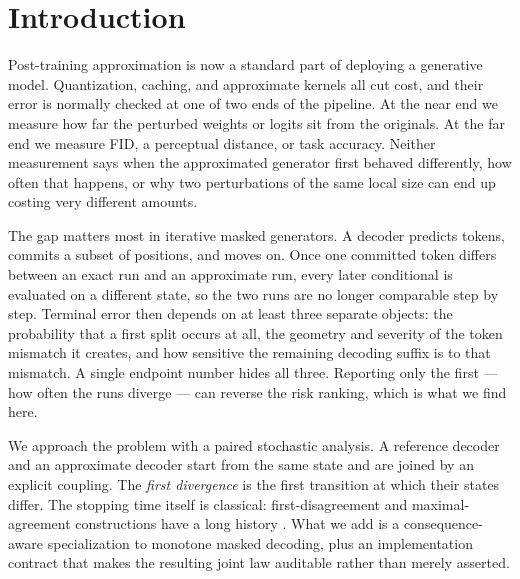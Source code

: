 \documentclass[11pt,a4paper]{article}
\theoremstyle{plain}
\theoremstyle{definition}
\theoremstyle{remark}
\begin{document}
\vspace{0.4em}
\noindent{}

\section{Introduction}

Post-training approximation is now a standard part of deploying a generative
model. Quantization, caching, and approximate kernels all cut cost, and their
error is normally checked at one of two ends of the pipeline. At the near end we
measure how far the perturbed weights or logits sit from the originals. At the
far end we measure FID, a perceptual distance, or task accuracy. Neither
measurement says when the approximated generator first behaved differently, how
often that happens, or why two perturbations of the same local size can end up
costing very different amounts.

The gap matters most in iterative masked generators. A decoder predicts tokens,
commits a subset of positions, and moves on. Once one committed token differs
between an exact run and an approximate run, every later conditional is evaluated
on a different state, so the two runs are no longer comparable step by step.
Terminal error then depends on at least three separate objects: the probability
that a first split occurs at all, the geometry and severity of the token mismatch
it creates, and how sensitive the remaining decoding suffix is to that mismatch.
A single endpoint number hides all three. Reporting only the first --- how often
the runs diverge --- can reverse the risk ranking, which is what we find here.

We approach the problem with a paired stochastic analysis. A reference decoder
and an approximate decoder start from the same state and are joined by an
explicit coupling. The \emph{first divergence} is the first transition at which
their states differ. The stopping time itself is classical: first-disagreement
and maximal-agreement constructions have a long history
\citep{lindvall2002coupling,vollering2016maximal,ernst2019mexit}. What we add is
a consequence-aware specialization to monotone masked decoding, plus an
implementation contract that makes the resulting joint law auditable rather than
merely asserted.
\end{document}
